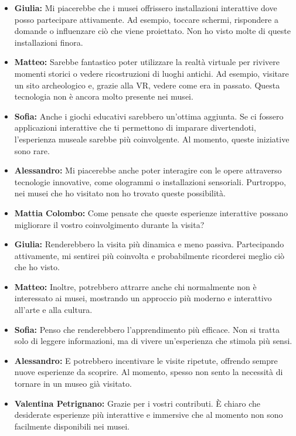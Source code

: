 \documentclass{article}
\begin{document}
\begin{itemize}
    \item \textbf{Giulia:} Mi piacerebbe che i musei offrissero installazioni interattive dove posso partecipare attivamente. Ad esempio, toccare schermi, rispondere a domande o influenzare ciò che viene proiettato. Non ho visto molte di queste installazioni finora.

    \item \textbf{Matteo:} Sarebbe fantastico poter utilizzare la realtà virtuale per rivivere momenti storici o vedere ricostruzioni di luoghi antichi. Ad esempio, visitare un sito archeologico e, grazie alla VR, vedere come era in passato. Questa tecnologia non è ancora molto presente nei musei.

    \item \textbf{Sofia:} Anche i giochi educativi sarebbero un’ottima aggiunta. Se ci fossero applicazioni interattive che ti permettono di imparare divertendoti, l’esperienza museale sarebbe più coinvolgente. Al momento, queste iniziative sono rare.
    
    \item \textbf{Alessandro:} Mi piacerebbe anche poter interagire con le opere attraverso tecnologie innovative, come ologrammi o installazioni sensoriali. Purtroppo, nei musei che ho visitato non ho trovato queste possibilità.
    
    \item \textbf{Mattia Colombo:} Come pensate che queste esperienze interattive possano migliorare il vostro coinvolgimento durante la visita?
    
    \item \textbf{Giulia:} Renderebbero la visita più dinamica e meno passiva. Partecipando attivamente, mi sentirei più coinvolta e probabilmente ricorderei meglio ciò che ho visto.
    
    \item \textbf{Matteo:} Inoltre, potrebbero attrarre anche chi normalmente non è interessato ai musei, mostrando un approccio più moderno e interattivo all’arte e alla cultura.
    
    \item \textbf{Sofia:} Penso che renderebbero l’apprendimento più efficace. Non si tratta solo di leggere informazioni, ma di vivere un’esperienza che stimola più sensi.
    
    \item \textbf{Alessandro:} E potrebbero incentivare le visite ripetute, offrendo sempre nuove esperienze da scoprire. Al momento, spesso non sento la necessità di tornare in un museo già visitato.
    
    \item \textbf{Valentina Petrignano:} Grazie per i vostri contributi. È chiaro che desiderate esperienze più interattive e immersive che al momento non sono facilmente disponibili nei musei.
    
    
\end{itemize}
\end{document}
